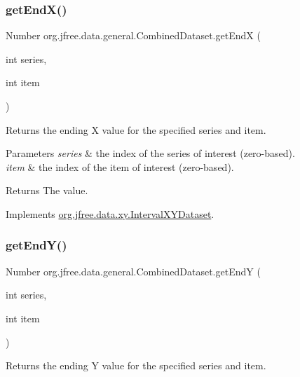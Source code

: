 \subsubsection{\texorpdfstring{get\+End\+X()}{getEndX()}}
{\footnotesize\ttfamily Number org.\+jfree.\+data.\+general.\+Combined\+Dataset.\+get\+EndX (\begin{DoxyParamCaption}\item[{int}]{series,  }\item[{int}]{item }\end{DoxyParamCaption})}

Returns the ending X value for the specified series and item.


\begin{DoxyParams}{Parameters}
{\em series} & the index of the series of interest (zero-\/based). \\
\hline
{\em item} & the index of the item of interest (zero-\/based).\\
\hline
\end{DoxyParams}
\begin{DoxyReturn}{Returns}
The value. 
\end{DoxyReturn}


Implements \mbox{\hyperlink{interfaceorg_1_1jfree_1_1data_1_1xy_1_1_interval_x_y_dataset_a93161a6d6c1db37cfac030239c62ab0a}{org.\+jfree.\+data.\+xy.\+Interval\+X\+Y\+Dataset}}.

\mbox{\label{classorg_1_1jfree_1_1data_1_1general_1_1_combined_dataset_a6a2884b2c6d9b9e538a984b9aa99efe1}} 
\subsubsection{\texorpdfstring{get\+End\+Y()}{getEndY()}}
{\footnotesize\ttfamily Number org.\+jfree.\+data.\+general.\+Combined\+Dataset.\+get\+EndY (\begin{DoxyParamCaption}\item[{int}]{series,  }\item[{int}]{item }\end{DoxyParamCaption})}

Returns the ending Y value for the specified series and item.


